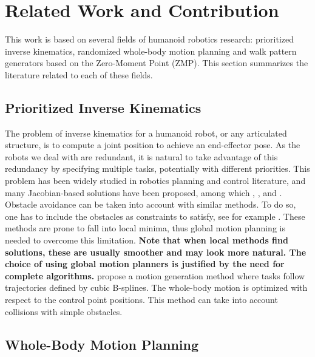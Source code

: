 \documentclass{article}
\begin{document}
\section{Related Work and Contribution}
\label{sec:related}


This work is based on several fields of humanoid robotics research:
prioritized inverse kinematics, randomized whole-body motion planning
and walk pattern generators based on the Zero-Moment Point (ZMP). This
section summarizes the literature related to each of these fields.

\subsection{Prioritized Inverse Kinematics}

The problem of inverse kinematics for a humanoid robot, or any articulated
structure, is to compute a joint position to achieve an end-effector pose. As the
robots we deal with are redundant, it is natural to take advantage of
this redundancy by specifying multiple tasks, potentially with
different priorities. This problem has been widely studied in robotics
planning and control literature, and many Jacobian-based solutions have been
proposed, among which 
\cite{nakamura1986iks}, \cite{siciliano1991gfm},
\cite{baerlocher1998tpf} and \cite{khatib2004wbd}.
Obstacle avoidance can be taken into account with similar methods. To
do so, one has to include the obstacles as  constraints to
satisfy, see for example \cite{kanehiro2008lca}.
These methods are prone to fall into local minima, thus global motion
planning is needed to overcome this limitation. 
{\bf Note that when local methods find solutions, these are usually smoother
and may look more natural. The choice of using global motion planners
is justified by the need for complete algorithms.}
\cite{TouGieGoe2007} propose a motion generation method where tasks follow
trajectories defined by cubic B-splines. The whole-body motion is optimized
with respect to the control point positions. This method can take into account
collisions with simple obstacles.

\subsection{Whole-Body Motion Planning}
\end{document}
